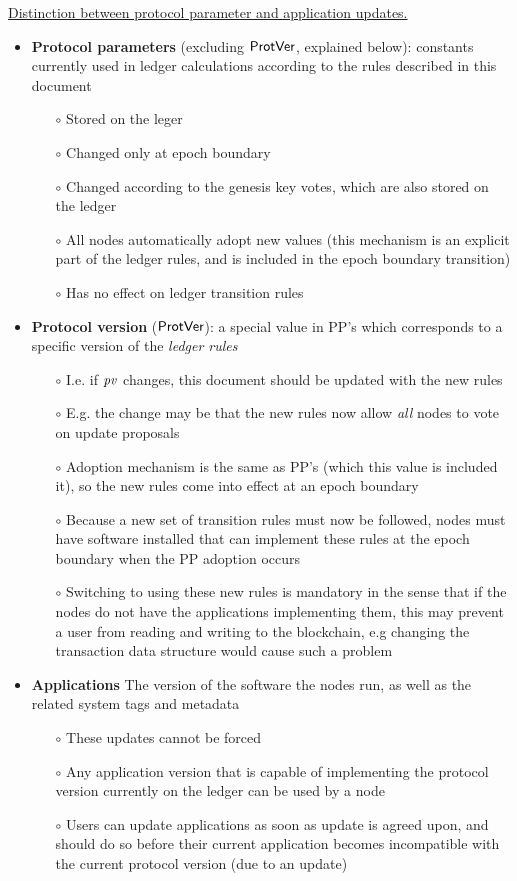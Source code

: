 \underline{Distinction between protocol parameter and application updates.}
\begin{itemize}
\item \textbf{Protocol parameters} (excluding $\mathsf{ProtVer}$, explained below): constants
currently used in ledger calculations according to the rules described in this document
\begin{itemize}
\item[$\circ$] Stored on the leger
\item[$\circ$] Changed only at epoch boundary
\item[$\circ$] Changed according to the genesis key votes, which are also stored on the ledger
\item[$\circ$] All nodes automatically adopt new values (this mechanism is an explicit
 part of the ledger rules, and is included in the epoch boundary transition)
\item[$\circ$] Has no effect on ledger transition rules
\end{itemize}
\item \textbf{Protocol version} ($\mathsf{ProtVer}$): a special value in PP's which
corresponds to a specific version of the \textit{ledger rules}
\begin{itemize}
\item[$\circ$] I.e. if $\mathit{pv}$ changes, this document should be updated with
the new rules
\item[$\circ$] E.g. the change may be that the new rules now allow \textit{all} nodes
to vote on update proposals
\item[$\circ$] Adoption mechanism is the same as PP's (which this value is included it),
so the new rules come into effect at an epoch boundary
\item[$\circ$] Because a new set of transition rules must now be followed, nodes must have
software installed that can implement these rules at the epoch boundary
when the PP adoption occurs
\item[$\circ$] Switching to using these new rules is mandatory in the sense that
if the nodes do not have the applications implementing them, this
may prevent a user from reading and
writing to the blockchain, e.g changing the
transaction data structure would cause such a problem
\end{itemize}
\item \textbf{Applications} The version of the software the nodes run,
as well as the related system tags and metadata
\begin{itemize}
\item[$\circ$] These updates cannot be forced
\item[$\circ$] Any application version that is capable of implementing the protocol version
currently on the ledger can be used by a node
\item[$\circ$] Users can update applications as soon as update is agreed upon, and should
do so before their current application becomes incompatible with the
current protocol version (due to an update)
\end{itemize}
\end{itemize}


